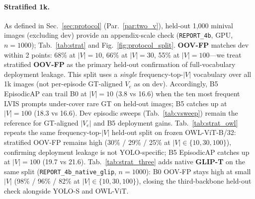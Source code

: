\documentclass[10pt,twocolumn,letterpaper]{article}
\begin{document}
\begin{table}[t]
\centering
\small

\caption{GPU noise matrix (seed 42, 5 episodes/config).}
\label{tab:noise}
\end{table}

\paragraph{Stratified 1k.}
As defined in Sec.~\ref{sec:protocol} (Par.~\ref{par:two_v}), held-out 1,000 minival images (excluding dev) provide an appendix-scale check (\texttt{REPORT\_4b}, GPU, $n{=}1000$); Tab.~\ref{tab:strat} and Fig.~\ref{fig:protocol_split}.
\textbf{OOV-FP} matches dev within 2 points: 68\% at $|V|{=}10$, 66\% at $|V|{=}30$, 55\% at $|V|{=}100$---we treat stratified \textbf{OOV-FP} as the primary held-out confirmation of full-vocabulary deployment leakage.
This split uses a \emph{single} frequency-top-$|V|$ vocabulary over all 1k images (not per-episode GT-aligned $V_e$ as on dev).
Accordingly, B5 EpisodicAP can trail B0 at $|V|{=}10$ (3.8 vs 16.6) when the ten most frequent LVIS prompts under-cover rare GT on held-out images; B5 catches up at $|V|{=}100$ (18.3 vs 16.6).
Dev episodic sweeps (Tab.~\ref{tab:vsweep}) remain the reference for GT-aligned $|V_e|$ and B5 deployment gains.
Tab.~\ref{tab:strat_owl} repeats the same frequency-top-$|V|$ held-out split on frozen OWL-ViT-B/32: stratified OOV-FP remains high (30\% / 29\% / 25\% at $|V|{\in}\{10,30,100\}$), confirming deployment leakage is not YOLO-specific; B5 EpisodicAP catches up at $|V|{=}100$ (19.7 vs 21.6).
Tab.~\ref{tab:strat_three} adds native \textbf{GLIP-T} on the same split (\texttt{REPORT\_4b\_native\_glip}, $n{=}1000$): B0 OOV-FP stays high at small $|V|$ (98\% / 96\% / 82\% at $|V|{\in}\{10,30,100\}$), closing the third-backbone held-out check alongside YOLO-S and OWL-ViT.

\begin{table}[t]
\centering
\small

\caption{Stratified 1k held-out minival (GPU, YOLO-S). OOV-FP confirms dev; EpisodicAP uses frequency-top-$|V|$ (see text).}
\label{tab:strat}
\end{table}

\begin{table}[t]
\centering
\small

\caption{Stratified 1k cross-backbone: YOLO-S vs OWL-ViT-B/32 (GPU v2, \texttt{REPORT\_4b\_owlvit}).}
\label{tab:strat_owl}
\end{table}
\end{document}

